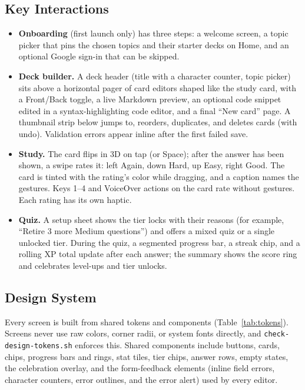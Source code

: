 \documentclass[12pt,letterpaper]{article}
\begin{document}
\subsection{Key Interactions}
\begin{itemize}
  \item \textbf{Onboarding} (first launch only) has three steps: a welcome screen,
        a topic picker that pins the chosen topics and their starter decks on Home,
        and an optional Google sign-in that can be skipped.
  \item \textbf{Deck builder.} A deck header (title with a character counter, topic
        picker) sits above a horizontal pager of card editors shaped like the study
        card, with a Front/Back toggle, a live Markdown preview, an optional code
        snippet edited in a syntax-highlighting code editor, and a final ``New card''
        page. A thumbnail strip below jumps to, reorders, duplicates, and deletes
        cards (with undo). Validation errors appear inline after the first failed save.
  \item \textbf{Study.} The card flips in 3D on tap (or Space); after the answer has
        been shown, a swipe rates it: left Again, down Hard, up Easy, right Good. The
        card is tinted with the rating's color while dragging, and a caption names the
        gestures. Keys 1--4 and VoiceOver actions on the card rate without gestures.
        Each rating has its own haptic.
  \item \textbf{Quiz.} A setup sheet shows the tier locks with their reasons (for
        example, ``Retire 3 more Medium questions'') and offers a mixed quiz or a single
        unlocked tier. During the quiz, a segmented progress bar, a streak chip, and a
        rolling XP total update after each answer; the summary shows the score ring and
        celebrates level-ups and tier unlocks.
\end{itemize}

\subsection{Design System}
Every screen is built from shared tokens and components (Table~\ref{tab:tokens}).
Screens never use raw colors, corner radii, or system fonts directly, and
\texttt{check-design-tokens.sh} enforces this. Shared components include buttons, cards,
chips, progress bars and rings, stat tiles, tier chips, answer rows, empty states, the
celebration overlay, and the form-feedback elements (inline field errors, character
counters, error outlines, and the error alert) used by every editor.
\end{document}
